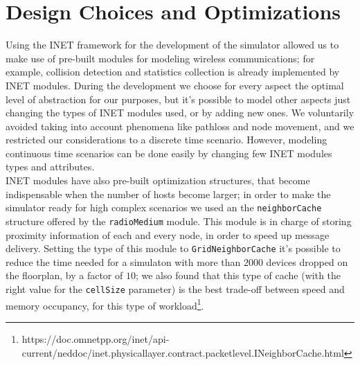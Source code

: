 \section{Design Choices and Optimizations}
Using the INET framework for the development of the simulator allowed us to
make use of pre-built modules for modeling wireless communications; for example,
collision detection and statistics collection is already implemented by INET
modules. During the development we choose for every aspect the optimal level of
abstraction for our purposes, but it's possible to model other aspects just 
changing the types of INET modules used, or by adding new ones. We voluntarily
avoided taking into account phenomena like pathloss and node movement, and we 
restricted our considerations to a discrete time scenario. However, modeling
continuous time scenarios can be done easily by changing few INET modules types
and attributes.\\
INET modules have also pre-built optimization structures, that become
indispensable when the number of hosts become larger; in order to make the
simulator ready for high complex scenarios we used an the \texttt{neighborCache}
structure offered by the \texttt{radioMedium} module. This module is in charge
of storing proximity information of each and every node, in order to speed up
message delivery. Setting the type of this module to \texttt{GridNeighborCache}
it's possible to reduce the time needed for a simulaton with more than
$2000$ devices dropped on the floorplan, by a factor of $10$; we also found that
this type of cache (with the right value for the \texttt{cellSize} parameter) is
the best trade-off between speed and memory occupancy, for this type of
workload\footnote{https://doc.omnetpp.org/inet/api-current/neddoc/inet.physicallayer.contract.packetlevel.INeighborCache.html}.  
